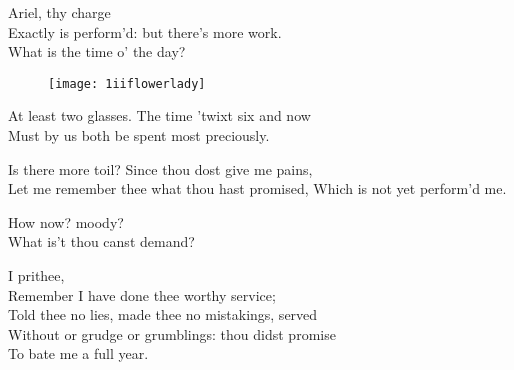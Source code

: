 \begin{verse_speech}[Prospero] 
Ariel, thy charge\\
Exactly is perform'd: but there's more work.\\
What is the time o' the day?
\end{verse_speech}



\begin{figure}[tbh]
\centering
\texttt{[image: 1iiflowerlady]}
\end{figure}

\begin{verse_speech}[Prospero] 
At least two glasses. The time 'twixt six and now\\
Must by us both be spent most preciously.
\end{verse_speech}

\begin{verse_speech}[Ariel] 
Is there more toil? Since thou dost give me pains,\\
Let me remember thee what thou hast promised,
Which is not yet perform'd me.
\end{verse_speech}

\begin{verse_speech}[Prospero] 
How now? moody?\\
What is't thou canst demand?
\end{verse_speech}

	
	
\begin{verse_speech}[Ariel] 
I prithee,\\
Remember I have done thee worthy service;\\
Told thee no lies, made thee no mistakings, served\\
Without or grudge or grumblings: thou didst promise\\
To bate me a full year.
\end{verse_speech}

